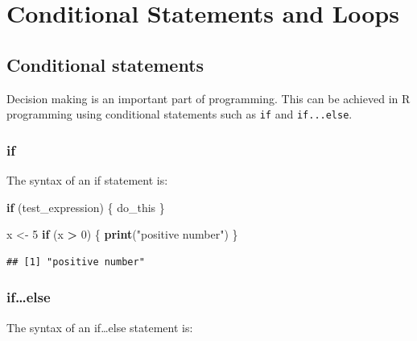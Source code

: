 \documentclass[]{book}
\newenvironment{Shaded}{\begin{snugshade}}{\end{snugshade}}
\newcommand{\ControlFlowTok}[1]{\textcolor[rgb]{0.13,0.29,0.53}{\textbf{#1}}}
\newcommand{\DecValTok}[1]{\textcolor[rgb]{0.00,0.00,0.81}{#1}}
\newcommand{\KeywordTok}[1]{\textcolor[rgb]{0.13,0.29,0.53}{\textbf{#1}}}
\newcommand{\NormalTok}[1]{#1}
\newcommand{\OperatorTok}[1]{\textcolor[rgb]{0.81,0.36,0.00}{\textbf{#1}}}
\newcommand{\StringTok}[1]{\textcolor[rgb]{0.31,0.60,0.02}{#1}}
\begin{document}
\hypertarget{conditional-statements-and-loops}{%
\chapter{Conditional Statements and Loops}\label{conditional-statements-and-loops}}

\hypertarget{conditional-statements}{%
\section{Conditional statements}\label{conditional-statements}}

Decision making is an important part of programming. This can be achieved in R programming using conditional statements such as \texttt{if} and \texttt{if...else}.

\hypertarget{if}{%
\subsection*{if}\label{if}}

The syntax of an if statement is:

\begin{Shaded}
\begin{Highlighting}[]
\ControlFlowTok{if}\NormalTok{ (test_expression) \{}
\NormalTok{  do_this}
\NormalTok{\}}
\end{Highlighting}
\end{Shaded}

\begin{Shaded}
\begin{Highlighting}[]
\NormalTok{x <-}\StringTok{ }\DecValTok{5}
\ControlFlowTok{if}\NormalTok{ (x }\OperatorTok{>}\StringTok{ }\DecValTok{0}\NormalTok{) \{}
  \KeywordTok{print}\NormalTok{(}\StringTok{"positive number"}\NormalTok{)}
\NormalTok{\}}
\end{Highlighting}
\end{Shaded}

\begin{verbatim}
## [1] "positive number"
\end{verbatim}

\hypertarget{ifelse}{%
\subsection*{if\ldots{}else}\label{ifelse}}

The syntax of an if\ldots{}else statement is:
\end{document}
